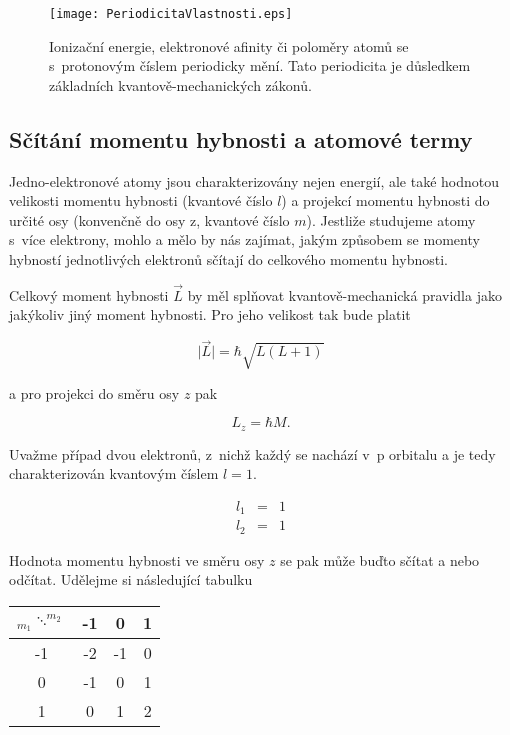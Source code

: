 \begin{figure} [htb]
\centering
\texttt{[image: PeriodicitaVlastnosti.eps]}
\caption[Periodicita vlastností prvků]{Ionizační energie, elektronové afinity či poloměry atomů se s~protonovým číslem periodicky mění. Tato periodicita je důsledkem základních kvantově-mechanických zákonů.}
\label{obr:Period}
\end{figure}


\subsection{Sčítání momentu hybnosti a atomové termy}
Jedno-elektronové atomy jsou charakterizovány nejen energií, ale také hodnotou velikosti momentu hybnosti (kvantové číslo $l$) a projekcí momentu hybnosti do určité osy (konvenčně do osy z, kvantové číslo $m$). Jestliže studujeme atomy s~více elektrony, mohlo a mělo by nás zajímat, jakým způsobem se momenty hybností jednotlivých elektronů sčítají do celkového momentu hybnosti.

Celkový moment hybnosti $\vec{L}$ by měl splňovat kvantově-mechanická pravidla jako jakýkoliv jiný moment hybnosti. Pro jeho velikost tak bude platit

\begin{equation}
\vert \vec{L} \vert = \hbar \sqrt{L(L+1)}
\label{rov:VE-63}
\end{equation}

\noindent a pro projekci do směru osy $z$ pak

\begin{equation}
L_z = \hbar M.
\label{rov:VE-64}
\end{equation}
 

Uvažme případ dvou elektronů, z~nichž každý se nachází v~p orbitalu a je tedy charakterizován kvantovým číslem $l=1$.

\begin{eqnarray*}
l_1 &=& 1 \\
l_2 &=& 1
\end{eqnarray*}

\noindent Hodnota momentu hybnosti ve směru osy $z$ se pak může buďto sčítat a nebo odčítat. Udělejme si následující tabulku

\begin{table}[ht]
\centering
\begin{tabular}{c|ccc}
\toprule
    $_{m_1}\ddots^{m_2}$      & -1    & 0     & 1 \\
\midrule
    -1    & -2    & -1    & 0 \\
    0     & -1    & 0     & 1 \\
    1     & 0     & 1     & 2 \\
\bottomrule
\end{tabular}
\label{tab:ScitaniHybnosti}
\end{table}



